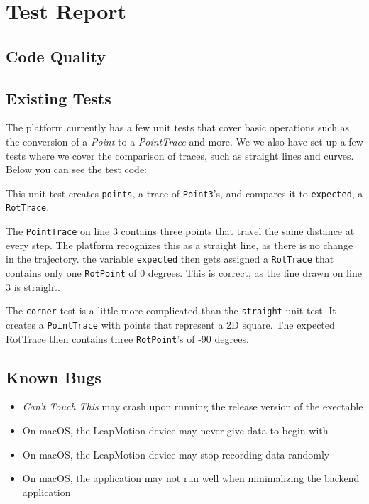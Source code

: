 \documentclass[a4paper]{article}
\providecommand{\tightlist}{%
\setlength{\itemsep}{0pt}\setlength{\parskip}{0pt}}
\begin{document}
  \section{Test Report}
  \subsection{Code Quality} %
  \subsection{Existing Tests} %
  The platform currently has a few unit tests that cover basic operations such
  as the conversion of a \textit{Point} to a \textit{PointTrace} and more. We
  we also have set up a few tests where we cover the comparison of traces, such
  as straight lines and curves. Below you can see the test code:
  

  This unit test creates \verb_points_, a trace of \verb_Point3_'s, and compares
  it to \verb_expected_, a \verb_RotTrace_.

  The \verb_PointTrace_ on line 3 contains three points that travel the same
  distance at every step. The platform recognizes this as a straight line, as
  there is no change in the trajectory. the variable \verb_expected_ then gets
  assigned a \verb_RotTrace_ that contains only one \verb_RotPoint_ of 0
  degrees. This is correct, as the line drawn on line 3 is straight.

  
  The \verb_corner_ test is a little more complicated than the \verb_straight_
  unit test. It creates a \verb_PointTrace_ with points that represent a 2D
  square. The expected RotTrace then contains three \verb_RotPoint_'s of -90
  degrees.

  \subsection{Known Bugs}
  \begin{itemize}
    \tightlist
    \item \textit{Can't Touch This} may crash upon running the release version
      of the exectable
    \item On macOS, the LeapMotion device may never give data to begin with
    \item On macOS, the LeapMotion device may stop recording data randomly
    \item On macOS, the application may not run well when minimalizing the
      backend application
  \end{itemize}
\end{document}
